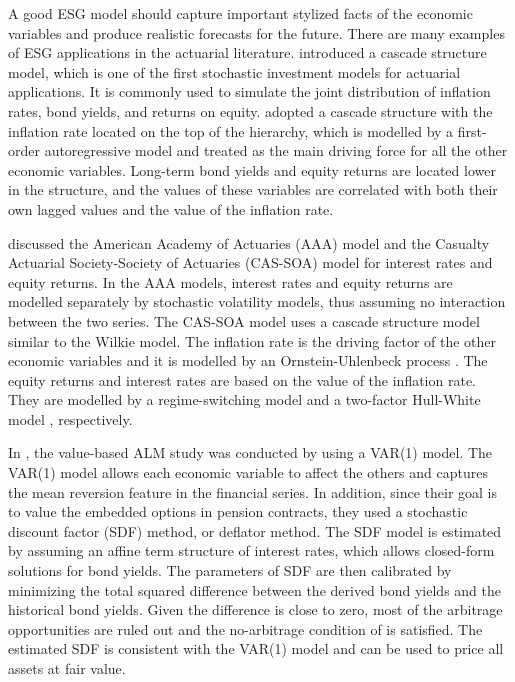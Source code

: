 \documentclass{sfuthesis}
\numberwithin{equation}{chapter}
\begin{document}
		\justify
		A good ESG model should capture important stylized facts of the economic variables and produce realistic forecasts for the future. There are many examples of ESG applications in the actuarial literature. \citet{Wilkie1984} introduced a cascade structure model, which is one of the first stochastic investment models for actuarial applications. It is commonly used to simulate the joint distribution of inflation rates, bond yields, and returns on equity. \citet{Wilkie1984} adopted a cascade structure with the inflation rate located on the top of the hierarchy, which is modelled by a first-order autoregressive model and treated as the main driving force for all the other economic variables. Long-term bond yields and equity returns are located lower in the structure, and the values of these variables are correlated with both their own lagged values and the value of the inflation rate.
	
	
	
		\justify
		\citet{Ahlgrim2008} discussed the American Academy of Actuaries (AAA) model and the Casualty Actuarial Society-Society of Actuaries (CAS-SOA) model for interest rates and equity returns. In the AAA models, interest rates and equity returns are modelled separately by stochastic volatility models, thus assuming no interaction between the two series. The CAS-SOA model uses a cascade structure model similar to the Wilkie model. The inflation rate is the driving factor of the other economic variables and it is modelled by an Ornstein-Uhlenbeck process \citep{Uhlenbeck1930}. The equity returns and interest rates are based on the value of the inflation rate. They are modelled  by a regime-switching model and a two-factor Hull-White model \citep{Hull1990}, respectively.
	
	
	
		\justify
		In \citet{Hoevenaars2008}, the value-based ALM study was conducted by using a VAR(1) model. The VAR(1) model allows each economic variable to affect the others and captures the mean reversion feature in the financial series. In addition, since their goal is to value the embedded options in pension contracts, they used a stochastic discount factor (SDF) method, or deflator method. The SDF model is estimated by assuming an affine term structure of interest rates, which allows closed-form solutions for bond yields. The parameters of SDF are then calibrated by minimizing the total squared difference between the derived bond yields and the historical bond yields. Given the difference is close to zero, most of the arbitrage opportunities are ruled out and the no-arbitrage condition of \citet{Harrison1979} is satisfied. The estimated SDF is consistent with the VAR(1) model and can be used to price all assets at fair value.
	
\end{document}
